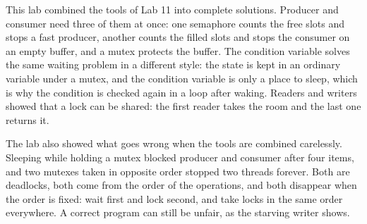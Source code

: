 \documentclass[11pt,a4paper]{article}
\begin{document}

This lab combined the tools of Lab 11 into complete solutions. Producer and consumer need three
of them at once: one semaphore counts the free slots and stops a fast producer, another counts
the filled slots and stops the consumer on an empty buffer, and a mutex protects the buffer.
The condition variable solves the same waiting problem in a different style: the state is kept
in an ordinary variable under a mutex, and the condition variable is only a place to sleep,
which is why the condition is checked again in a loop after waking. Readers and writers showed
that a lock can be shared: the first reader takes the room and the last one returns it.

The lab also showed what goes wrong when the tools are combined carelessly. Sleeping while
holding a mutex blocked producer and consumer after four items, and two mutexes taken in
opposite order stopped two threads forever. Both are deadlocks, both come from the order of the
operations, and both disappear when the order is fixed: wait first and lock second, and take
locks in the same order everywhere. A correct program can still be unfair, as the starving
writer shows.
\end{document}
